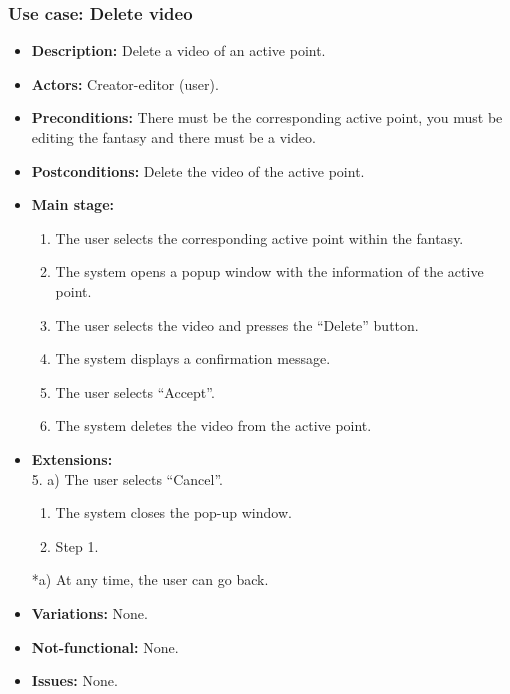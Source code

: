 \subsubsection{Use case: Delete video}
\begin{itemize}
	\item \textbf{Description:} Delete a video of an active point.
	\item \textbf{Actors:} Creator-editor (user).
	\item \textbf{Preconditions:} There must be the corresponding active point, you must be editing the fantasy and there must be a video.
	\item \textbf{Postconditions:} Delete the video of the active point.
	\item \textbf{Main stage:}
	\begin{enumerate}
		\item The user selects the corresponding active point within the fantasy.
		\item The system opens a popup window with the information of the active point.
		\item The user selects the video and presses the ``Delete'' button.
		\item The system displays a confirmation message.
		\item The user selects ``Accept''.
		\item The system deletes the video from the active point.
	\end{enumerate}
	\item \textbf{Extensions:} \\ 5. a) The user selects ``Cancel''.
	\begin{enumerate}
		\item The system closes the pop-up window.
		\item Step 1.
	\end{enumerate}
	*a) At any time, the user can go back.
	\item \textbf{Variations:} None.
	\item \textbf{Not-functional:} None.
	\item \textbf{Issues:} None.
\end{itemize}


